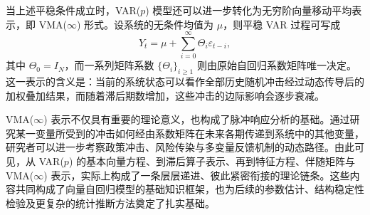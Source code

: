 当上述平稳条件成立时，VAR($p$) 模型还可以进一步转化为无穷阶向量移动平均表示，即 VMA($\infty$) 形式。设系统的无条件均值为 $\mu$，则平稳 VAR 过程可写成
\begin{equation}
Y_t = \mu + \sum_{i=0}^{\infty}\Theta_i\varepsilon_{t-i},
\end{equation}
其中 $\Theta_0=I_N$，而一系列矩阵系数 $\{\Theta_i\}_{i\ge 1}$ 则由原始自回归系数矩阵唯一决定。这一表示的含义是：当前的系统状态可以看作全部历史随机冲击经过动态传导后的加权叠加结果，而随着滞后期数增加，这些冲击的边际影响会逐步衰减。

VMA($\infty$) 表示不仅具有重要的理论意义，也构成了脉冲响应分析的基础。通过研究某一变量所受到的冲击如何经由系数矩阵在未来各期传递到系统中的其他变量，研究者可以进一步考察政策冲击、风险传染与多变量反馈机制的动态路径。由此可见，从 VAR($p$) 的基本向量方程、到滞后算子表示、再到特征方程、伴随矩阵与 VMA($\infty$) 表示，实际上构成了一条层层递进、彼此紧密衔接的理论链条。这些内容共同构成了向量自回归模型的基础知识框架，也为后续的参数估计、结构稳定性检验及更复杂的统计推断方法奠定了扎实基础。

